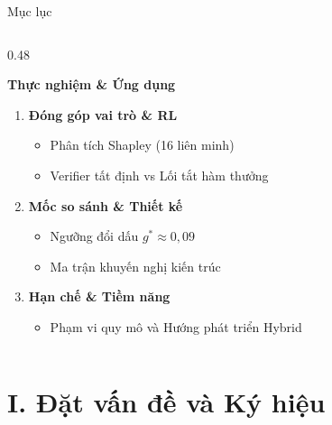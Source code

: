 \documentclass[aspectratio=169,10pt]{beamer}
\begin{document}
\begin{frame}{Mục lục}
\begin{columns}[t]
    \begin{column}{0.48\textwidth}
      \begin{block}{\textbf{Thực nghiệm \& Ứng dụng}}
        \begin{enumerate}
          \item[\textbf{IV.}] \textbf{Đóng góp vai trò \& RL}
          \begin{itemize}\footnotesize
            \item Phân tích Shapley (16 liên minh)
            \item Verifier tất định vs Lối tắt hàm thưởng
          \end{itemize}
          \item[\textbf{V.}] \textbf{Mốc so sánh \& Thiết kế}
          \begin{itemize}\footnotesize
            \item Ngưỡng đổi dấu $g^* \approx 0{,}09$
            \item Ma trận khuyến nghị kiến trúc
          \end{itemize}
          \item[\textbf{VI.}] \textbf{Hạn chế \& Tiềm năng}
          \begin{itemize}\footnotesize
            \item Phạm vi quy mô và Hướng phát triển Hybrid
          \end{itemize}
        \end{enumerate}
      \end{block}
    \end{column}
  \end{columns}
\end{frame}

\section{I. Đặt vấn đề và Ký hiệu}
\end{document}
